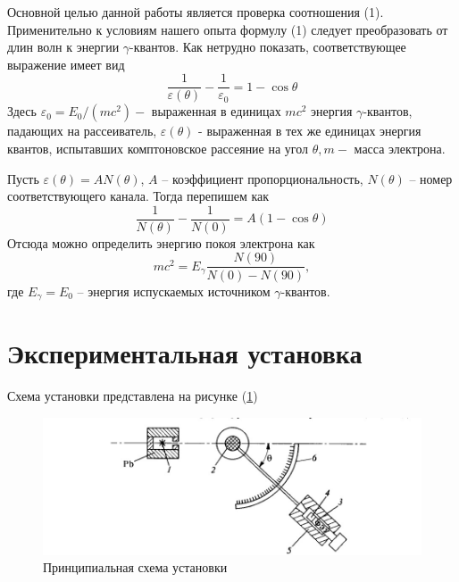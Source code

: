 \documentclass[a4paper, 12pt]{article}
\begin{document}
Основной целью данной работы является проверка соотношения (1). Применительно к условиям нашего опыта формулу (1) следует преобразовать от длин волн к энергии $\gamma$-квантов. Как нетрудно показать, соответствующее выражение имеет вид
\begin{equation*}
\frac{1}{\varepsilon(\theta)}-\frac{1}{\varepsilon_0}=1-\cos \theta
\end{equation*}
Здесь $\varepsilon_0=E_0 /\left(m c^2\right)-$ выраженная в единицах $m c^2$ энергия $\gamma$-квантов, падающих на рассеиватель, $\varepsilon(\theta)$ - выраженная в тех же единицах энергия квантов, испытавших комптоновское рассеяние на угол $\theta, m-$ масса электрона.

Пусть $\varepsilon(\theta) = AN(\theta)$, $A$ -- коэффициент пропорциональность, $N(\theta)$ -- номер соответствующего канала. Тогда перепишем как
\begin{equation}
	\dfrac{1}{N(\theta)} - \dfrac{1}{N(0)} = A(1-\cos \theta)
\end{equation}
Отсюда можно определить энергию покоя электрона как 
\begin{equation}\label{eq:main}
mc^2 = E_\gamma \dfrac{N(90)}{N(0) - N(90)},
\end{equation}
где $E_\gamma = E_0$ -- энергия испускаемых источником $\gamma$-квантов.
\section{Экспериментальная установка}
Схема установки представлена на рисунке (\ref{fig:set})

\begin{figure}[H]
    \centering
    \includegraphics[width=1\textwidth]{set.jpg}
    \caption{Принципиальная схема установки}
    \label{fig:set}
\end{figure}
\end{document}
